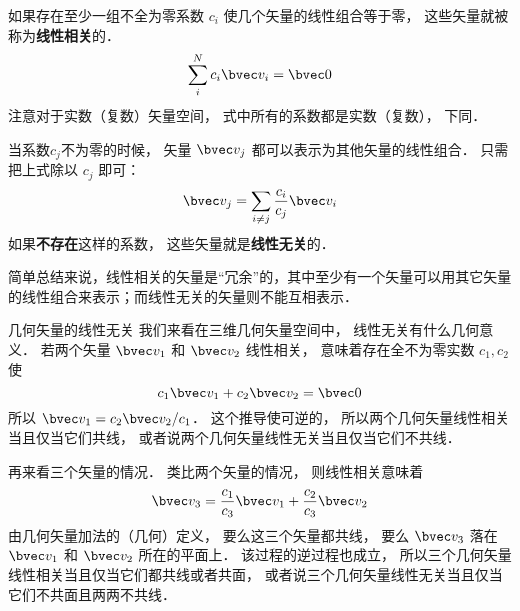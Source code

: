 
\begin{issues}
\end{issues}



如果存在至少一组不全为零系数 $c_i$ 使几个矢量的线性组合等于零， 这些矢量就被称为\textbf{线性相关}的．
\begin{equation}
\sum_i^N c_i \bvec v_i = \bvec 0
\end{equation}
注意对于实数（复数）矢量空间， 式中所有的系数都是实数（复数）， 下同．

当系数$c_j$不为零的时候， 矢量 $\bvec v_j$ 都可以表示为其他矢量的线性组合． 只需把上式除以 $c_j$ 即可：
\begin{equation}
\bvec v_j = \sum_{i \ne j}\frac{c_i}{c_j} \bvec v_i
\end{equation}
如果\textbf{不存在}这样的系数， 这些矢量就是\textbf{线性无关}的．

简单总结来说，线性相关的矢量是“冗余”的，其中至少有一个矢量可以用其它矢量的线性组合来表示；而线性无关的矢量则不能互相表示．

\begin{example}{几何矢量的线性无关}\label{LinInd_ex2}
我们来看在三维几何矢量空间中， 线性无关有什么几何意义． 若两个矢量 $\bvec v_1$ 和 $\bvec v_2$ 线性相关， 意味着存在全不为零实数 $c_1, c_2$ 使
\begin{equation}
c_1 \bvec v_1 + c_2 \bvec v_2 = \bvec 0
\end{equation}
所以 $\bvec v_1 = c_2 \bvec v_2 / c_1$． 这个推导使可逆的， 所以两个几何矢量线性相关当且仅当它们共线， 或者说两个几何矢量线性无关当且仅当它们不共线．

再来看三个矢量的情况． 类比两个矢量的情况， 则线性相关意味着
\begin{equation}
\bvec v_3 = \frac{c_1}{c_3} \bvec v_1 +  \frac{c_2}{c_3} \bvec v_2
\end{equation}
由几何矢量加法的（几何）定义， 要么这三个矢量都共线， 要么 $\bvec v_3$ 落在 $\bvec v_1$ 和 $\bvec v_2$ 所在的平面上． 该过程的逆过程也成立， 所以三个几何矢量线性相关当且仅当它们都共线或者共面， 或者说三个几何矢量线性无关当且仅当它们不共面且两两不共线．
\end{example}

